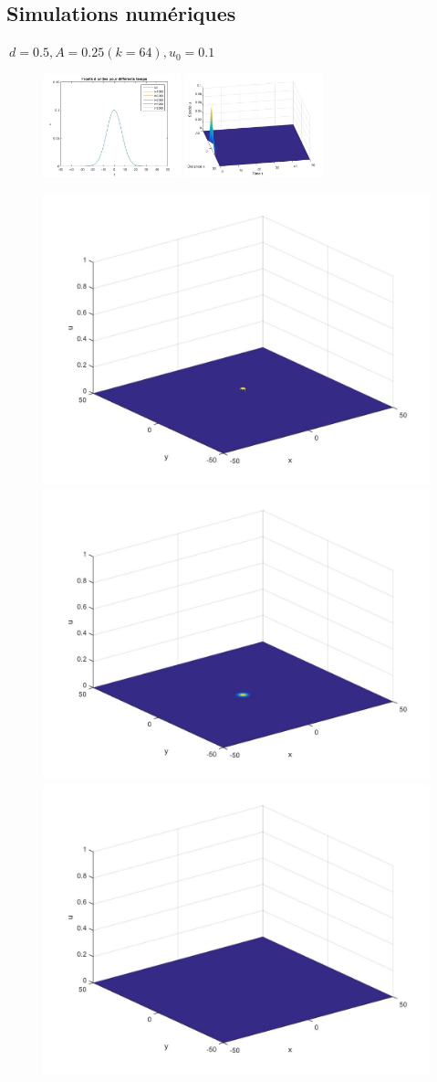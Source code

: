 \documentclass[10pt]{beamer}
\begin{document}
\subsection{Simulations numériques}
\begin{frame}{$\ d=0.5, A=0.25 (k=64), u_0=0.1$}{}
\begin{figure}[H]
	\centering
	\includegraphics[width=0.40\linewidth, height=3cm]{Allee/F2311}\hfill
	\includegraphics[width=0.55\linewidth, height=3cm]{Allee/F4311}
\end{figure}
\begin{figure}[H]
	\centering
	\includegraphics[width=0.3\linewidth]{Allee/311__1_}\hfill
    \includegraphics[width=0.3\linewidth]{Allee/311__2_}\hfill
	\includegraphics[width=0.3\linewidth]{Allee/311__3_}
\end{figure}
\end{frame}
\end{document}
